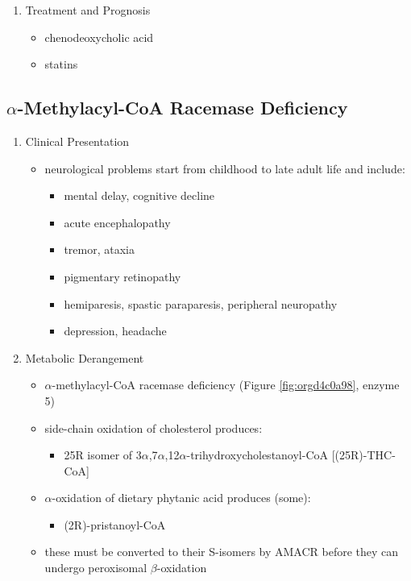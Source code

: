 \documentclass[12pt]{scrartcl}
\begin{document}
\begin{enumerate}
\item Treatment and Prognosis
\label{sec:orgb10a2ac}
\begin{itemize}
\item chenodeoxycholic acid
\item statins
\end{itemize}
\end{enumerate}
\subsection{\(\alpha\)-Methylacyl-CoA Racemase Deficiency}
\label{sec:orga011895}
\begin{enumerate}
\item Clinical Presentation
\label{sec:orga122d10}
\begin{itemize}
\item neurological problems start from childhood to late adult life and
include:
\begin{itemize}
\item mental delay, cognitive decline
\item acute encephalopathy
\item tremor, ataxia
\item pigmentary retinopathy
\item hemiparesis, spastic paraparesis, peripheral neuropathy
\item depression, headache
\end{itemize}
\end{itemize}

\item Metabolic Derangement
\label{sec:orge50f153}
\begin{itemize}
\item \(\alpha\)-methylacyl-CoA racemase deficiency (Figure \ref{fig:orgd4c0a98}, enzyme 5)
\item side-chain oxidation of cholesterol produces:
\begin{itemize}
\item 25R isomer of 3\(\alpha\),7\(\alpha\),12\(\alpha\)-trihydroxycholestanoyl-CoA [(25R)-THC-CoA]
\end{itemize}
\item \(\alpha\)-oxidation of dietary phytanic acid produces (some):
\begin{itemize}
\item (2R)-pristanoyl-CoA
\end{itemize}
\item these must be converted to their S-isomers by AMACR before they can
undergo peroxisomal \(\beta\)-oxidation
\end{itemize}


\end{enumerate}
\end{document}
